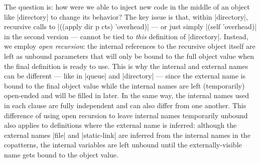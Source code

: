 The question is: how were we able to inject new code in the middle of an object like \scm|directory| to change its behavior?
The key issue is that, within \scm|directory|, recursive calls to \scm|((apply dir p cts) 'overhead)| --- or just simply \scm|(self 'overhead)| in the second version --- cannot be tied to \emph{this} definition of \scm|directory|.
Instead, we employ \emph{open recursion}: the internal references to the recursive object itself are left as unbound parameters that will only be bound to the full object value when the final definition is ready to use.
This is why the internal and external names can be different --- like in \scm|queue| and \scm|directory| --- since the external name is bound to the final object value while the internal names are left (temporarily) open-ended and will be filled in later.
In the same way, the internal names used in each clause are fully independent and can also differ from one another.
This difference of using open recursion to leave internal names temporarily unbound also applies to definitions where the external name is inferred: although the external names \scm|file| and \scm|static-link| are inferred from the internal names in the copatterns, the internal variables are left unbound until the externally-visible name gets bound to the object value.

